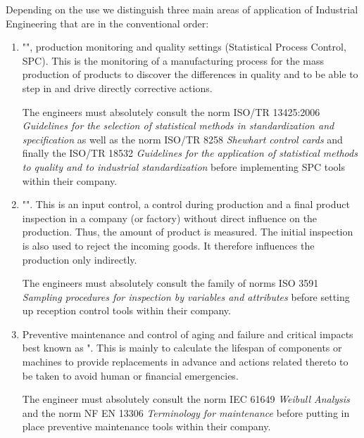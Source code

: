 Depending on the use we distinguish three main areas of application of Industrial Engineering that are in the conventional order:
\begin{enumerate}
	\item "", production monitoring and quality settings (Statistical Process Control, SPC). This is the monitoring of a manufacturing process for the mass production of products to discover the differences in quality and to be able to step in and drive directly corrective actions.
	
	The engineers must absolutely consult the norm ISO/TR 13425:2006 \textit{Guidelines for the selection of statistical methods in standardization and specification} as well as the norm ISO/TR 8258 \textit{Shewhart control cards} and finally the ISO/TR 18532 \textit{Guidelines for the application of statistical methods to quality and to industrial standardization} before implementing SPC tools within their company.
	
	\item "". This is an input control, a control during production and a final product inspection in a company (or factory) without direct influence on the production. Thus, the amount of product is measured. The initial inspection is also used to reject the incoming goods. It therefore influences the production only indirectly.
	
	The engineers must absolutely consult the family of norms ISO 3591 \textit{Sampling procedures for inspection by variables and attributes} before setting up reception control tools within their company.
	
	\item Preventive maintenance and control of aging and failure and critical impacts best known as ". This is mainly to calculate the lifespan of components or machines to provide replacements in advance and actions related thereto to be taken to avoid human or financial emergencies.
	
	The engineer must absolutely consult the norm IEC 61649 \textit{Weibull Analysis} and the norm NF EN 13306 \textit{Terminology for maintenance} before putting in place preventive maintenance tools within their company.
\end{enumerate}

